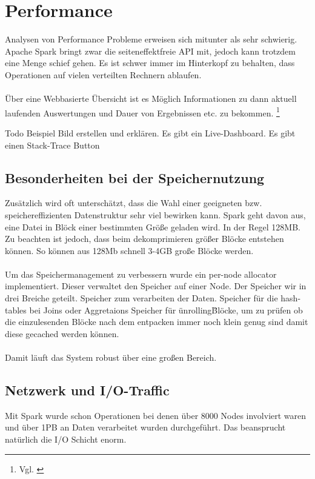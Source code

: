 \newpage
\section{Performance}
Analysen von Performance Probleme erweisen sich mitunter als sehr schwierig. Apache Spark bringt zwar die seiteneffektfreie API mit, jedoch kann trotzdem eine Menge schief gehen. Es ist schwer immer im Hinterkopf zu behalten, dass Operationen auf vielen verteilten Rechnern ablaufen. \\ \\
\"Uber eine Webbasierte Übersicht ist es Möglich Informationen zu dann aktuell laufenden Auswertungen und Dauer von Ergebnissen etc. zu bekommen. \footnote{Vgl. \cite[12]{AAWS15}}

Todo Beispiel Bild erstellen und erklären.
Es gibt ein Live-Dashboard.
Es gibt einen Stack-Trace Button




\subsection{Besonderheiten bei der Speichernutzung}
Zusätzlich wird oft unterschätzt, dass die Wahl einer geeigneten bzw. speichereffizienten Datenstruktur sehr viel bewirken kann.
Spark geht davon aus, eine Datei in Blöck einer bestimmten Größe geladen wird. In der Regel 128MB. Zu beachten ist jedoch, dass beim dekomprimieren größer Blöcke entstehen können. So können aus 128Mb schnell 3-4GB große Blöcke werden. \\ \\
Um das Speichermanagement zu verbessern wurde ein per-node allocator implementiert. Dieser verwaltet den Speicher auf einer Node. 
Der Speicher wir in drei Breiche geteilt. 
Speicher zum verarbeiten der Daten.  
Speicher für die hash-tables bei Joins oder Aggretaions
Speicher für \"unrolling\" Blöcke, um zu prüfen ob die einzulesenden Blöcke nach dem entpacken immer noch klein genug sind damit diese gecached werden können.\\ \\
Damit läuft das System robust über eine großen Bereich. 

\subsection{Netzwerk und I/O-Traffic}

Mit Spark wurde schon Operationen bei denen über 8000 Nodes involviert waren und über 1PB an Daten verarbeitet wurden durchgeführt.
Das beansprucht natürlich die I/O Schicht enorm. 


